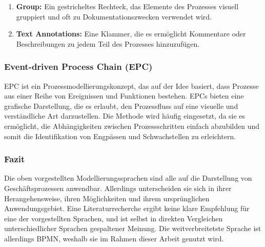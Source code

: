 \begin{enumerate}[label=\arabic*., leftmargin=*]
\begin{enumerate}
        \item[] \begin{minipage}{\linewidth}
            \textbf{Group:} Ein gestricheltes Rechteck, das Elemente des Prozesses visuell gruppiert und oft zu Dokumentationszwecken verwendet wird.
            \begin{center}
            \end{center}
        \end{minipage}
    
        \item[] \begin{minipage}{\linewidth}
            \textbf{Text Annotations:} Eine Klammer, die es ermöglicht Kommentare oder Beschreibungen zu jedem Teil des Prozesses hinzuzufügen.
            \begin{center}
            \end{center}
        \end{minipage}
    \end{enumerate}
\end{enumerate}

\subsubsection{Event-driven Process Chain (EPC)}
EPC ist ein Prozessmodellierungskonzept, das auf der Idee basiert, dass Prozesse aus einer Reihe von Ereignissen und Funktionen bestehen.
EPCs bieten eine grafische Darstellung, die es erlaubt, den Prozessfluss auf eine visuelle und verständliche Art darzustellen.
Die Methode wird häufig eingesetzt, da sie es ermöglicht, die Abhängigkeiten zwischen Prozessschritten einfach abzubilden und somit die Identifikation von Engpässen und Schwachstellen zu erleichtern.

\subsubsection{Fazit}
Die oben vorgestellten Modellierungssprachen sind alle auf die Darstellung von Geschäftsprozessen anwendbar. Allerdings unterscheiden sie sich in ihrer Herangehensweise, ihren Möglichkeiten und ihrem ursprünglichen Anwendungsgebiet.
Eine Literaturrecherche ergibt keine klare Empfehlung für eine der vorgestellten Sprachen, und ist selbst in direkten Vergleichen unterschiedlicher Sprachen gespaltener Meinung.
Die weitverbreitetste Sprache ist allerdings BPMN, weshalb sie im Rahmen dieser Arbeit genutzt wird.~\cite{Peixoto2008, Niziol2021}